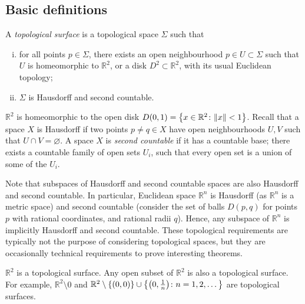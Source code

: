 \subsection{Basic definitions}
\begin{definition}
	A \textit{topological surface} is a topological space \( \Sigma \) such that
	\begin{enumerate}[(i)]
		\item for all points \( p \in \Sigma \), there exists an open neighbourhood \( p \in U \subset \Sigma \) such that \( U \) is homeomorphic to \( \mathbb R^2 \), or a disk \( D^2 \subset \mathbb R^2 \), with its usual Euclidean topology;
		\item \( \Sigma \) is Hausdorff and second countable.
	\end{enumerate}
\end{definition}
\begin{remark}
	\( \mathbb R^2 \) is homeomorphic to the open disk \( D(0,1) = \qty{ x \in \mathbb R^2 \colon \norm{x} < 1 } \).
	Recall that a space \( X \) is Hausdorff if two points \( p \neq q \in X \) have open neighbourhoods \( U, V \) such that \( U \cap V = \varnothing \).
	A space \( X \) is \textit{second countable} if it has a countable base; there exists a countable family of open sets \( U_i \), such that every open set is a union of some of the \( U_i \).

	Note that subspaces of Hausdorff and second countable spaces are also Hausdorff and second countable.
	In particular, Euclidean space \( \mathbb R^n \) is Hausdorff (as \( \mathbb R^n \) is a metric space) and second countable (consider the set of balls \( D(p,q) \) for points \( p \) with rational coordinates, and rational radii \( q \)).
	Hence, any subspace of \( \mathbb R^n \) is implicitly Hausdorff and second countable.
	These topological requirements are typically not the purpose of considering topological spaces, but they are occasionally technical requirements to prove interesting theorems.
\end{remark}
\begin{example}
	\( \mathbb R^2 \) is a topological surface.
	Any open subset of \( \mathbb R^2 \) is also a topological surface.
	For example, \( \mathbb R^2 \setminus \qty{0} \) and \( \mathbb R^2 \setminus \qty{(0,0)} \cup \qty{\qty(0, \frac{1}{n}) \colon n = 1, 2, \dots} \) are topological surfaces.
\end{example}
